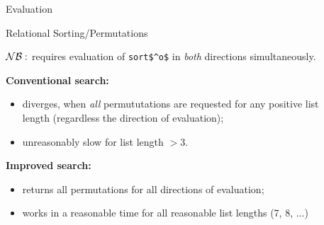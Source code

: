 \documentclass[final,20pt]{beamer}
\begin{document}
\begin{frame}[t]
\begin{columns}[t]
\begin{column}{\onecolwid}
  \end{column}

  \begin{column}{\sepwid}\end{column} %

  \begin{column}{\onecolwid} %
   
    \begin{block}{Evaluation}
    
    \vskip5mm
    
     \begin{exampleblock}{Relational Sorting/Permutations}
        \justifying
        
        \bigskip

 

        
        \bigskip
        $\cal{NB}:$ requires evaluation of \lstinline|sort$^o$| in \emph{both} directions simultaneously.

        \bigskip
        \justifying
        \textbf{Conventional search:}
        \begin{itemize}
           \justifying
           \item diverges, when \emph{all} permututations are requested for 
                 any positive list length (regardless the direction of evaluation);
           \item unreasonably slow for list length $>3$. 
        \end{itemize}
        \textbf{Improved search:}
        \begin{itemize}
           \justifying
           \item returns all permutations for all directions of evaluation;
           \item works in a reasonable time for all reasonable list lengths (7, 8, ...)
        \end{itemize}
	 \end{exampleblock}


\end{block}
\end{column}
\end{columns}
\end{frame}
\end{document}
